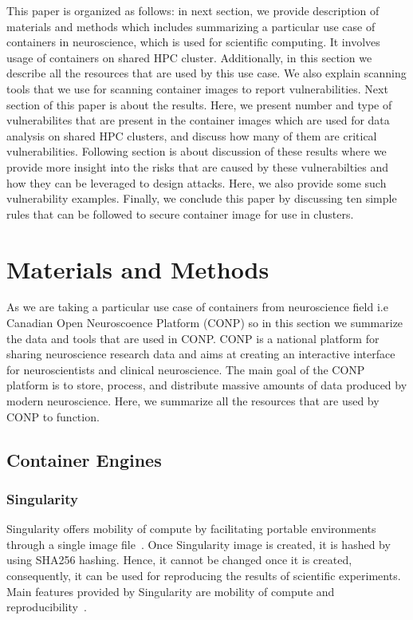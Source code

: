 \documentclass[a4paper,num-refs]{oup-contemporary}
\begin{document}
This paper is organized as follows: in next section, we provide description
of materials and methods which includes summarizing a particular use case of
containers in neuroscience, which is used for scientific computing. It involves
usage of containers on shared HPC cluster. Additionally, in this section we
describe all the resources that are used by this use case. We also explain
scanning tools that we use for scanning container images to report
vulnerabilities. Next section of this paper is about the results. Here, we
present number and type of vulnerabilites that are present in the container images
which are used for data analysis on shared HPC clusters, and discuss how many of them are
critical vulnerabilities. Following section is about discussion of these results
where we provide more insight into the risks that are caused by these vulnerabilties
and how they can be leveraged to design attacks. Here, we also provide some such
vulnerability examples. Finally, we conclude this paper by discussing ten simple
rules that can be followed to secure container image for use in clusters.

\section{Materials and Methods}

As we are taking a particular use case of containers from
neuroscience field i.e Canadian Open Neuroscoence Platform (CONP) so  
in this section we summarize the data and tools 
that are used in CONP. CONP is a national platform for sharing neuroscience
research data and aims at creating an interactive interface for neuroscientists and
clinical neuroscience. The main goal of the CONP platform is to store, process, and
distribute massive amounts of data produced by modern neuroscience.
Here, we summarize all the resources that are
used by CONP to function.


\subsection{Container Engines}

\subsubsection{Singularity}

Singularity offers mobility of compute by facilitating portable environments 
through a single image file~\cite{kurtzer2016singularity}. Once Singularity image
is created, it is hashed by using SHA256 hashing. Hence, it cannot be changed
once it is created, consequently, it can be used for reproducing the results of
scientific experiments. Main features provided by
Singularity are mobility of compute and reproducibility~\cite{kurtzer2017singularity}.
\end{document}
